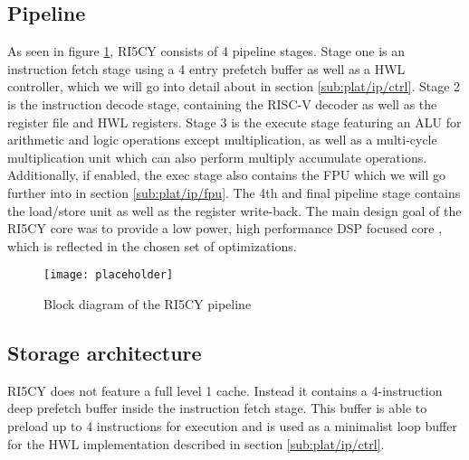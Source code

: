 \documentclass[../bachelor_paper.tex]{subfiles}
\begin{document}
\subsection{Pipeline}
    \label{sec:plat/pipe}
As seen in figure \ref{fig:plat/base/blockdia}, RI5CY consists of 4 pipeline stages. Stage one is an instruction fetch stage using a 4 entry prefetch buffer as well as a \ac{HWL} controller, which we will go into detail about in section \ref{sub:plat/ip/ctrl}. Stage 2 is the instruction decode stage, containing the RISC-V decoder as well as the register file and \ac{HWL} registers. Stage 3 is the execute stage featuring an \ac{ALU} for arithmetic and logic operations except multiplication, as well as a multi-cycle multiplication unit which can also perform multiply accumulate operations. Additionally, if enabled, the exec stage also contains the \ac{FPU} which we will go further into in section \ref{sub:plat/ip/fpu}. The 4th and final pipeline stage contains the load/store unit as well as the register write-back. The main design goal of the RI5CY core was to provide a low power, high performance \ac{DSP} focused core \cite{gautschiNearThresholdRISCVCore2017}, which is reflected in the chosen set of optimizations.

\begin{figure}
    \centering
    \texttt{[image: placeholder]}
    \caption{Block diagram of the RI5CY pipeline}
    \label{fig:plat/base/blockdia}
\end{figure}

\subsection{Storage architecture}
RI5CY does not feature a full level 1 cache. Instead it contains a 4-instruction deep prefetch buffer inside the instruction fetch stage. This buffer is able to preload up to 4 instructions for execution and is used as a minimalist loop buffer for the \ac{HWL} implementation described in section \ref{sub:plat/ip/ctrl}.
\end{document}
